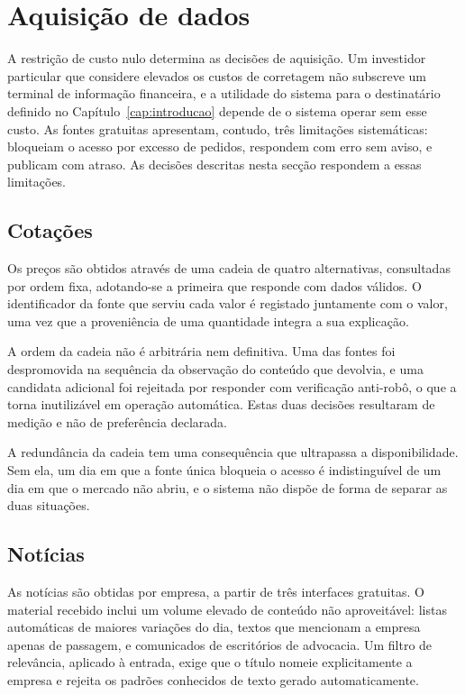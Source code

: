 \section{Aquisição de dados}
\label{sec:sis_dados}

A restrição de custo nulo determina as decisões de aquisição. Um investidor particular que
considere elevados os custos de corretagem não subscreve um terminal de informação financeira, e a
utilidade do sistema para o destinatário definido no Capítulo~\ref{cap:introducao} depende de o
sistema operar sem esse custo. As fontes gratuitas apresentam, contudo, três limitações
sistemáticas: bloqueiam o acesso por excesso de pedidos, respondem com erro sem aviso, e publicam
com atraso. As decisões descritas nesta secção respondem a essas limitações.

\subsection{Cotações}

Os preços são obtidos através de uma cadeia de quatro alternativas, consultadas por ordem fixa,
adotando-se a primeira que responde com dados válidos. O identificador da fonte que serviu cada
valor é registado juntamente com o valor, uma vez que a proveniência de uma quantidade integra a
sua explicação.

A ordem da cadeia não é arbitrária nem definitiva. Uma das fontes foi despromovida na sequência da
observação do conteúdo que devolvia, e uma candidata adicional foi rejeitada por responder com
verificação anti-robô, o que a torna inutilizável em operação automática. Estas duas decisões
resultaram de medição e não de preferência declarada.

A redundância da cadeia tem uma consequência que ultrapassa a disponibilidade. Sem ela, um dia em
que a fonte única bloqueia o acesso é indistinguível de um dia em que o mercado não abriu, e o
sistema não dispõe de forma de separar as duas situações.

\subsection{Notícias}
\label{sec:sis_fontes}

As notícias são obtidas por empresa, a partir de três interfaces gratuitas. O material recebido
inclui um volume elevado de conteúdo não aproveitável: listas automáticas de maiores variações do
dia, textos que mencionam a empresa apenas de passagem, e comunicados de escritórios de advocacia.
Um filtro de relevância, aplicado à entrada, exige que o título nomeie explicitamente a empresa e
rejeita os padrões conhecidos de texto gerado automaticamente.

